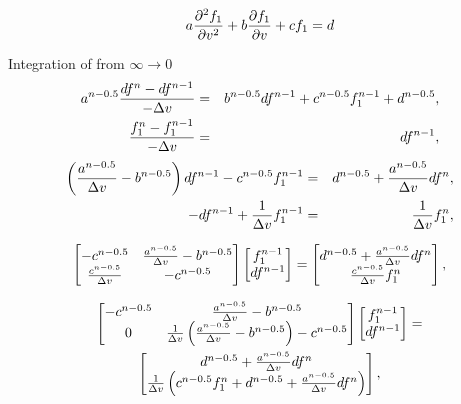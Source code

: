 \begin{equation} 
  a \frac{\partial^2 f_1}{\partial v^2} + b \frac{\partial{f_1}}{\partial{v}} + c f_1 
  = d
  \nonumber
\end{equation}

Integration of  from $\infty \rightarrow 0$
\begin{eqnarray}
  a^{n-0.5} \frac{df^n - df^{n-1}}{ - \Delta v} &=& b^{n-0.5} df^{n-1} 
  + c^{n-0.5} f_1^{n-1} + d^{n-0.5} ,
  \nonumber \\
  \frac{f_1^n - f_1^{n-1}}{- \Delta v} &=& df^{n-1} ,
  \nonumber
\end{eqnarray}
\begin{eqnarray}
  \left(\frac{a^{n-0.5}}{\Delta v} - b^{n-0.5}\right) df^{n-1} 
  - c^{n-0.5} f_1^{n-1}&=&  d^{n-0.5} + \frac{a^{n-0.5}}{\Delta v} df^n,
  \nonumber \\
  - df^{n-1} + \frac{1}{\Delta v} f_1^{n-1} &=&  
  \frac{1}{\Delta v} f_1^n ,
  \nonumber
\end{eqnarray}

\begin{equation}
  \begin{bmatrix}
    - c^{n-0.5}  &
	\frac{a^{n-0.5}}{\Delta v} - b^{n-0.5}
    \\
	\frac{c^{n-0.5}}{\Delta v} & -c^{n-0.5} 
  \end{bmatrix}
  \begin{bmatrix}
    f_1^{n-1} \\
    df^{n-1}
  \end{bmatrix}
  =  
  \begin{bmatrix}
    d^{n-0.5} + \frac{a^{n-0.5}}{\Delta v} df^n \\
    \frac{c^{n-0.5}}{\Delta v} f_1^n
  \end{bmatrix}   ,
  \nonumber
\end{equation}

\begin{multline}
  \begin{bmatrix}
    - c^{n-0.5}  &
	\frac{a^{n-0.5}}{\Delta v} - b^{n-0.5} 
    \\
	0 & 
	\frac{1}{\Delta v}
	\left(\frac{a^{n-0.5}}{\Delta v} - b^{n-0.5}\right) - c^{n-0.5} 
  \end{bmatrix}
  \begin{bmatrix}
    f_1^{n-1} \\
    df^{n-1}
  \end{bmatrix}
  =  \\
  \begin{bmatrix}
    d^{n-0.5} + \frac{a^{n-0.5}}{\Delta v} df^n \\
    \frac{1}{\Delta v} \left(c^{n-0.5}f_1^n + 
	d^{n-0.5} + \frac{a^{n-0.5}}{\Delta v} df^n \right) 
  \end{bmatrix}   ,
  \nonumber
\end{multline}

